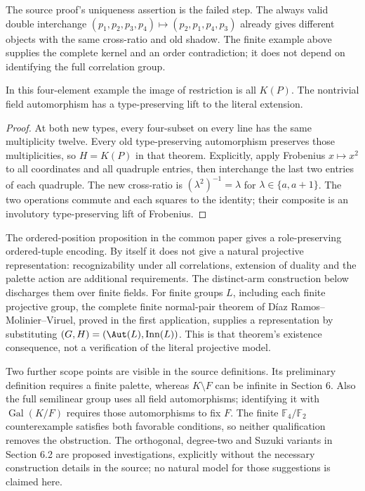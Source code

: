 The source proof's uniqueness assertion is the failed step. The always
valid double interchange
$(p_1,p_2,p_3,p_4)\mapsto(p_2,p_1,p_4,p_3)$ already gives different
objects with the same cross-ratio and old shadow. The finite example
above supplies the complete kernel and an order contradiction; it does
not depend on identifying the full correlation group.

\begin{proposition}
In this four-element example the image of restriction is all $K(P)$.
The nontrivial field automorphism has a type-preserving lift to the
literal extension.
\end{proposition}
\begin{proof}
At both new types, every four-subset on every line has the same
multiplicity twelve. Every old type-preserving automorphism preserves
those multiplicities, so $H=K(P)$ in that theorem. Explicitly,
apply Frobenius $x\mapsto x^2$ to all coordinates and all quadruple
entries, then interchange the last two entries of each quadruple.
The new cross-ratio is $(\lambda^2)^{-1}=\lambda$ for
$\lambda\in\{a,a+1\}$. The two operations commute and each squares
to the identity; their composite is an involutory type-preserving
lift of Frobenius.
\end{proof}

The ordered-position proposition in the common paper gives a role-preserving ordered-tuple
encoding. By itself it does not give a natural projective representation:
recognizability under all correlations, extension of duality and the palette
action are additional requirements. The distinct-arm construction below
discharges them over finite fields.
For finite groups $L$, including each finite projective group, the
complete finite normal-pair theorem of D\'iaz Ramos--Molinier--Viruel,
proved in the first application, supplies a representation by substituting
$(G,H)=(\Aut(L),\operatorname{Inn}(L))$. This is that theorem's
existence consequence, not a verification of the literal projective model.

Two further scope points are visible in the source definitions. Its
preliminary definition requires a finite palette, whereas $K\setminus F$
can be infinite in Section 6. Also the full semilinear group uses all
field automorphisms; identifying it with $\operatorname{Gal}(K/F)$
requires those automorphisms to fix $F$. The finite $\mathbb F_4/\mathbb F_2$
counterexample satisfies both favorable conditions, so neither
qualification removes the obstruction. The orthogonal, degree-two and
Suzuki variants in Section 6.2 are proposed investigations, explicitly
without the necessary construction details in the source; no natural
model for those suggestions is claimed here.

